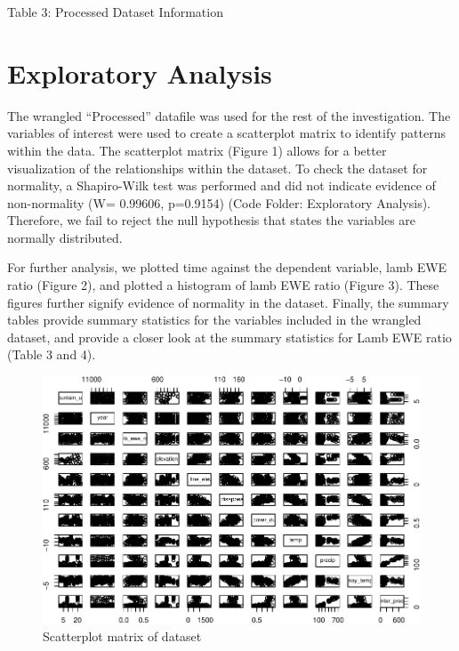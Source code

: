 \documentclass[
  12pt,
]{article}
\begin{document}
Table 3: Processed Dataset Information

\newpage

\hypertarget{exploratory-analysis}{%
\section{Exploratory Analysis}\label{exploratory-analysis}}

The wrangled ``Processed'' datafile was used for the rest of the
investigation. The variables of interest were used to create a
scatterplot matrix to identify patterns within the data. The scatterplot
matrix (Figure 1) allows for a better visualization of the relationships
within the dataset. To check the dataset for normality, a Shapiro-Wilk
test was performed and did not indicate evidence of non-normality (W=
0.99606, p=0.9154) (Code Folder: Exploratory Analysis). Therefore, we
fail to reject the null hypothesis that states the variables are
normally distributed.

For further analysis, we plotted time against the dependent variable,
lamb EWE ratio (Figure 2), and plotted a histogram of lamb EWE ratio
(Figure 3). These figures further signify evidence of normality in the
dataset. Finally, the summary tables provide summary statistics for the
variables included in the wrangled dataset, and provide a closer look at
the summary statistics for Lamb EWE ratio (Table 3 and 4).

\begin{figure}
\centering
\includegraphics{FastFajardoPlasynski_ENV872_Project_files/figure-latex/unnamed-chunk-1-1.pdf}
\caption{Scatterplot matrix of dataset}
\end{figure}
\end{document}
